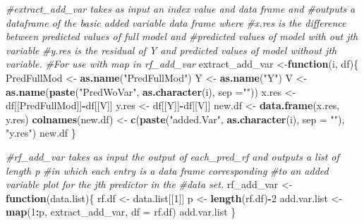 \documentclass[12pt,twoside]{reedthesis}
\newenvironment{Shaded}{\begin{snugshade}}{\end{snugshade}}
\newcommand{\KeywordTok}[1]{\textcolor[rgb]{0.13,0.29,0.53}{\textbf{#1}}}
\newcommand{\DataTypeTok}[1]{\textcolor[rgb]{0.13,0.29,0.53}{#1}}
\newcommand{\DecValTok}[1]{\textcolor[rgb]{0.00,0.00,0.81}{#1}}
\newcommand{\StringTok}[1]{\textcolor[rgb]{0.31,0.60,0.02}{#1}}
\newcommand{\CommentTok}[1]{\textcolor[rgb]{0.56,0.35,0.01}{\textit{#1}}}
\newcommand{\ControlFlowTok}[1]{\textcolor[rgb]{0.13,0.29,0.53}{\textbf{#1}}}
\newcommand{\OperatorTok}[1]{\textcolor[rgb]{0.81,0.36,0.00}{\textbf{#1}}}
\newcommand{\NormalTok}[1]{#1}
\theoremstyle{definition}
\theoremstyle{definition}
\theoremstyle{definition}
\theoremstyle{remark}
\begin{document}
\begin{Shaded}
\begin{Highlighting}[]
\CommentTok{#extract_add_var takes as input an index value and data frame and }
\CommentTok{#outputs a dataframe of the basic added variable data frame where }
\CommentTok{#x.res is the difference between predicted values of full model and }
\CommentTok{#predicted values of model with out jth variable}
\CommentTok{#y.res is the residual of Y and predicted values of model without jth variable.}
\CommentTok{#For use with map in rf_add_var}
\NormalTok{extract_add_var <-}\ControlFlowTok{function}\NormalTok{(i, df)\{}
\NormalTok{  PredFullMod <-}\StringTok{ }\KeywordTok{as.name}\NormalTok{(}\StringTok{"PredFullMod"}\NormalTok{)}
\NormalTok{  Y <-}\StringTok{ }\KeywordTok{as.name}\NormalTok{(}\StringTok{"Y"}\NormalTok{)}
\NormalTok{  V <-}\StringTok{ }\KeywordTok{as.name}\NormalTok{(}\KeywordTok{paste}\NormalTok{(}\StringTok{"PredWoVar"}\NormalTok{, }\KeywordTok{as.character}\NormalTok{(i), }\DataTypeTok{sep =}\StringTok{""}\NormalTok{))}
\NormalTok{  x.res <-}\StringTok{ }\NormalTok{df[[PredFullMod]]}\OperatorTok{-}\NormalTok{df[[V]]}
\NormalTok{  y.res <-}\StringTok{ }\NormalTok{df[[Y]]}\OperatorTok{-}\NormalTok{df[[V]]}
\NormalTok{  new.df <-}\StringTok{ }\KeywordTok{data.frame}\NormalTok{(x.res, y.res)}
  \KeywordTok{colnames}\NormalTok{(new.df) <-}\StringTok{ }\KeywordTok{c}\NormalTok{(}\KeywordTok{paste}\NormalTok{(}\StringTok{"added.Var"}\NormalTok{, }\KeywordTok{as.character}\NormalTok{(i), }\DataTypeTok{sep =} \StringTok{""}\NormalTok{), }\StringTok{"y.res"}\NormalTok{)}
\NormalTok{  new.df}
\NormalTok{\}}

\CommentTok{#rf_add_var takes as input the output of each_pred_rf and outputs a list of length p }
\CommentTok{#in which each entry is a data frame corresponding}
\CommentTok{#to an added variable plot for the jth predictor in the }
\CommentTok{#data set.}
\NormalTok{rf_add_var <-}\StringTok{ }\ControlFlowTok{function}\NormalTok{(data.list)\{}
\NormalTok{  rf.df <-}\StringTok{ }\NormalTok{data.list[[}\DecValTok{1}\NormalTok{]]}
\NormalTok{  p <-}\StringTok{ }\KeywordTok{length}\NormalTok{(rf.df)}\OperatorTok{-}\DecValTok{2}
\NormalTok{  add.var.list <-}\StringTok{ }\KeywordTok{map}\NormalTok{(}\DecValTok{1}\OperatorTok{:}\NormalTok{p, extract_add_var, }\DataTypeTok{df =}\NormalTok{ rf.df)}
\NormalTok{  add.var.list}
\NormalTok{\}}


\end{Highlighting}
\end{Shaded}
\end{document}
